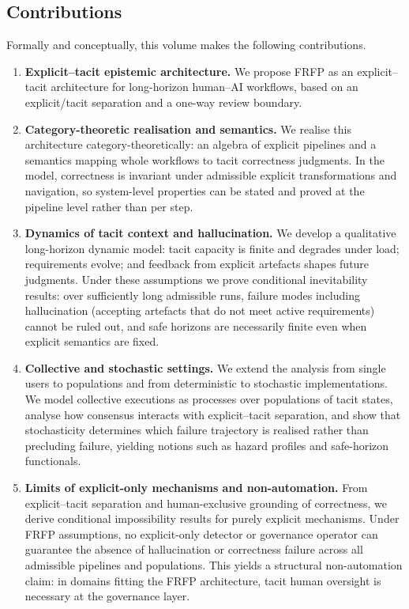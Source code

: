\documentclass[preprints,accept]{Definitions/mdpi}
\theoremstyle{definition}
\begin{document}
\subsection{Contributions}

Formally and conceptually, this volume makes the following contributions.
\begin{enumerate}
  \item \textbf{Explicit--tacit epistemic architecture.}
  We propose FRFP as an explicit--tacit architecture for long-horizon human--AI workflows, based on an explicit/tacit separation and a one-way review boundary.

  \item \textbf{Category-theoretic realisation and semantics.}
  We realise this architecture category-theoretically: an algebra of explicit pipelines and a semantics mapping whole workflows to tacit correctness judgments. In the model, correctness is invariant under admissible explicit transformations and navigation, so system-level properties can be stated and proved at the pipeline level rather than per step.

  \item \textbf{Dynamics of tacit context and hallucination.}
  We develop a qualitative long-horizon dynamic model: tacit capacity is finite and degrades under load; requirements evolve; and feedback from explicit artefacts shapes future judgments. Under these assumptions we prove conditional inevitability results: over sufficiently long admissible runs, failure modes including hallucination (accepting artefacts that do not meet active requirements) cannot be ruled out, and safe horizons are necessarily finite even when explicit semantics are fixed.

  \item \textbf{Collective and stochastic settings.}
  We extend the analysis from single users to populations and from deterministic to stochastic implementations. We model collective executions as processes over populations of tacit states, analyse how consensus interacts with explicit--tacit separation, and show that stochasticity determines which failure trajectory is realised rather than precluding failure, yielding notions such as hazard profiles and safe-horizon functionals.

  \item \textbf{Limits of explicit-only mechanisms and non-automation.}
  From explicit--tacit separation and human-exclusive grounding of correctness, we derive conditional impossibility results for purely explicit mechanisms. Under FRFP assumptions, no explicit-only detector or governance operator can guarantee the absence of hallucination or correctness failure across all admissible pipelines and populations. This yields a structural non-automation claim: in domains fitting the FRFP architecture, tacit human oversight is necessary at the governance layer.


\end{enumerate}
\end{document}
